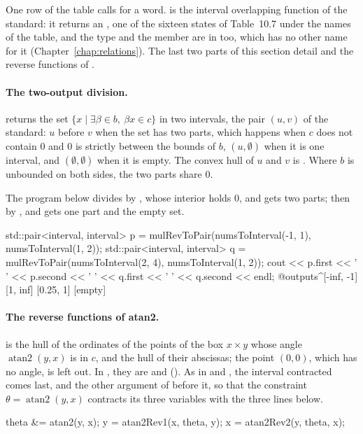 \noindent
One row of the table calls for a word.  is the interval
overlapping function of the standard: it returns an
, one of the sixteen states of Table~10.7 under the
names of the table, and the type and the member  are in
 too, which has no other name for it
(Chapter~\ref{chap:relations}).\newinvfive{} The last two parts of this section detail  and
the reverse functions of .

\paragraph{The two-output division.}
%
 returns the set
$\{x \mid \exists\beta\in b,\ \beta x\in c\}$ in two intervals, the pair
$(u,v)$ of the standard: $u$ before $v$ when the set has two parts, which
happens when $c$ does not contain 0 and 0 is strictly between the bounds of
$b$, $(u,\emptyset)$ when it is one interval, and $(\emptyset,\emptyset)$ when
it is empty. The convex hull of $u$ and $v$ is . Where
$b$ is unbounded on both sides, the two parts share 0.\newinvfive

\begin{Ex}\label{ex:ieee1788-mulrevtopair}
The program below divides  by , whose interior holds 0,
and gets two parts; then by , and gets one part and the empty set.
\begin{example}
std::pair<interval, interval> p = mulRevToPair(numsToInterval(-1, 1),
                                               numsToInterval(1, 2));
std::pair<interval, interval> q = mulRevToPair(numsToInterval(2, 4),
                                               numsToInterval(1, 2));
cout << p.first << ' ' << p.second << ' '
     << q.first << ' ' << q.second << endl;
@outputs^[-inf, -1] [1, inf] [0.25, 1] [empty]~
\end{example}
\end{Ex}

\paragraph{The reverse functions of atan2.}
%
 is the hull of the ordinates of the points of the
box $x\times y$ whose angle $\operatorname{atan2}(y,x)$ is in $c$, and
 the hull of their abscissas; the point $(0,0)$,
which has no angle, is left out. In , they are
 and 
().\newinvfive{} As in  and
, the interval contracted comes last, and the other argument
of  before it, so that the constraint
$\theta=\operatorname{atan2}(y,x)$ contracts its three variables with the
three lines below.
\begin{example}
theta &= atan2(y, x);
y = atan2Rev1(x, theta, y);
x = atan2Rev2(y, theta, x);
\end{example}

